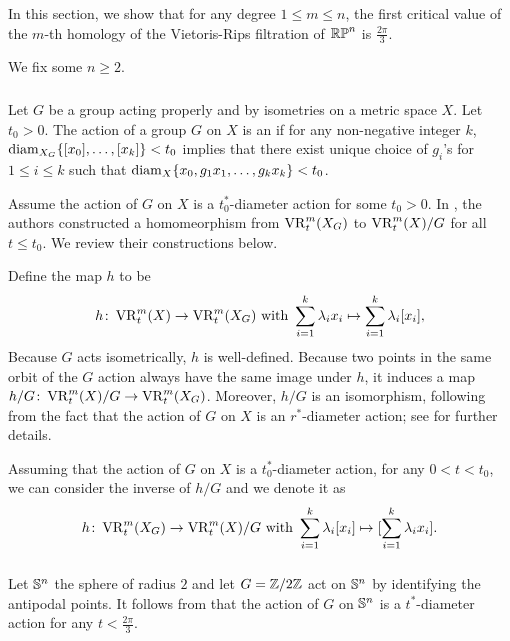 In this section, we show that for any degree $1 \leq m \leq n$, the first critical value of the $m$-th homology of the Vietoris-Rips filtration of $\mathbb{RP}^n$ is $\tfrac{2\pi}{3}.$

We fix some $n\geq 2.$

\subsubsection{}


Let $G$ be a group acting properly and by isometries on a metric space $X$.
Let $t_0>0$. The action of a group $G$ on $X$ is an  if for any non-negative integer $k$, $\operatorname{diam}_{X_G}\{[x_0],\dots,[x_k]\}<t_0$ implies that there exist unique choice of $g_i$'s for $1\leq i\leq k$ such that $\operatorname{diam}_{X}\{x_0,g_1x_1,\dots,g_kx_k\}<t_0$. 

Assume the action of $G$ on $X$ is a $t_0^*$-diameter action for some $t_0> 0$.
In \cite[Proposition 3.5]{adams2022metric}, the authors constructed a homomeorphism from $\operatorname{VR}_t^m(X_G)$ to $\operatorname{VR}_t^m(X)/G$ for all $t \leq t_0$.
We review their constructions below. 

Define the map $h$ to be
\[
h \colon \operatorname{VR}_t^m(X) \to \operatorname{VR}_t^m(X_G) 
\text{ with }
\sum_{i=1}^k \lambda_i x_i \mapsto \sum_{i=1}^k \lambda_i [x_i],
\]
Because $G$ acts isometrically, $h$ is well-defined.
Because two points in the same orbit of the $G$ action always have the same image under $h$, it induces a map $h/G \colon \operatorname{VR}_t^m(X)/G \to \operatorname{VR}_t^m(X_G)$.
Moreover, $h/G$ is an isomorphism, following from the fact that the action of $G$ on $X$ is an $r^*$-diameter action; see \cite[Proposition 3.5]{adams2022metric} for further details.

Assuming that the action of $G$ on $X$ is a $t_0^*$-diameter action, for any $0<t<t_0$, we can consider the inverse of $h/G$ and we denote it as
\[
h \colon \operatorname{VR}_t^m(X_G) \to \operatorname{VR}_t^m(X)/G
\text{ with }
\sum_{i=1}^k \lambda_i [x_i] \mapsto [\sum_{i=1}^k \lambda_i x_i].
\]


\subsubsection{}

Let $\mathbb{S}^n$ the sphere of radius $2$ and let $G=\mathbb{Z}/2\mathbb{Z}$ act on $\mathbb{S}^n$ by identifying the antipodal points.
It follows from \cite[Corollary]{adams2022metric} that the action of $G$ on $\mathbb{S}^n$ is a $t^*$-diameter action for any $t<\tfrac{2\pi}{3}$.

